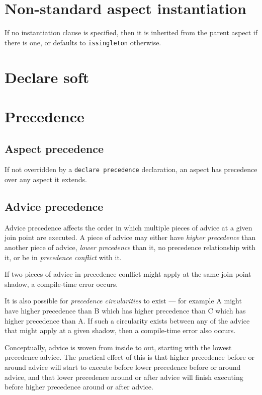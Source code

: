 \documentclass[12pt,a4paper]{report}
\begin{document}
\chapter{Non-standard aspect instantiation}

If no instantiation clause is specified, then it is inherited from the parent
aspect if there is one, or defaults to \verb|issingleton| otherwise.

\chapter{Declare soft}

\chapter{Precedence}
\section{Aspect precedence}
If not overridden by a \verb|declare precedence| declaration, an aspect 
has precedence over any aspect it extends.

\section{Advice precedence}
Advice precedence affects the order in which multiple pieces of advice
at a given join point are executed. A piece of advice may either have 
{\em higher precedence} than another piece of advice, 
{\em lower precedence} than it, 
no precedence relationship with it, 
or be in {\em precedence conflict} with it.

If two pieces of advice in precedence conflict might apply at the same
join point shadow, a compile-time error occurs.

It is also possible for {\em precedence circularities} to exist --- for example
A might have higher precedence than B which has higher precedence than C
which has higher precedence than A. If such a circularity exists between
any of the advice that might apply at a given shadow, then a compile-time
error also occurs.

Conceptually, advice is woven from inside to out, starting with the lowest
precedence advice. The practical effect of this is that higher precedence
before or around advice will start to execute before lower precedence before
or around advice, and that lower precedence around or after advice will 
finish executing before higher precedence around or after advice. 
\end{document}
